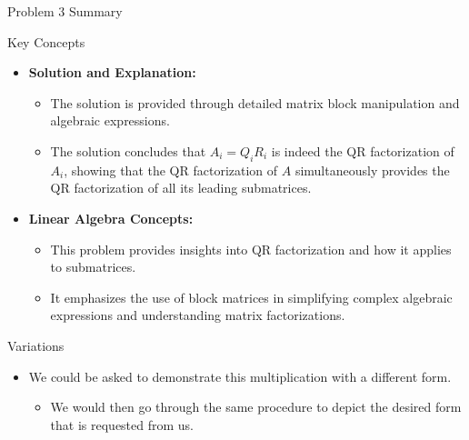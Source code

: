 \begin{summary}{Problem 3 Summary}
\begin{statement}{Key Concepts}
\begin{itemize}
\begin{itemize}
            \end{itemize}
            \item \textbf{Solution and Explanation:}
            \begin{itemize}
                \item The solution is provided through detailed matrix block manipulation and algebraic expressions.
                \item The solution concludes that $A_i = Q_i R_i$ is indeed the QR factorization of $A_i$, showing that the QR factorization of $A$ simultaneously provides the QR factorization of all 
                its leading submatrices.
            \end{itemize}
            \item \textbf{Linear Algebra Concepts:}
            \begin{itemize}
                \item This problem provides insights into QR factorization and how it applies to submatrices.
                \item It emphasizes the use of block matrices in simplifying complex algebraic expressions and understanding matrix factorizations.
            \end{itemize}
        \end{itemize}
    \end{statement}
    \begin{statement}{Variations}
        \begin{itemize}
            \item We could be asked to demonstrate this multiplication with a different form.
            \begin{itemize}
                \item We would then go through the same procedure to depict the desired form that is requested from us.
            \end{itemize}
        \end{itemize}
    \end{statement}
\end{summary}

